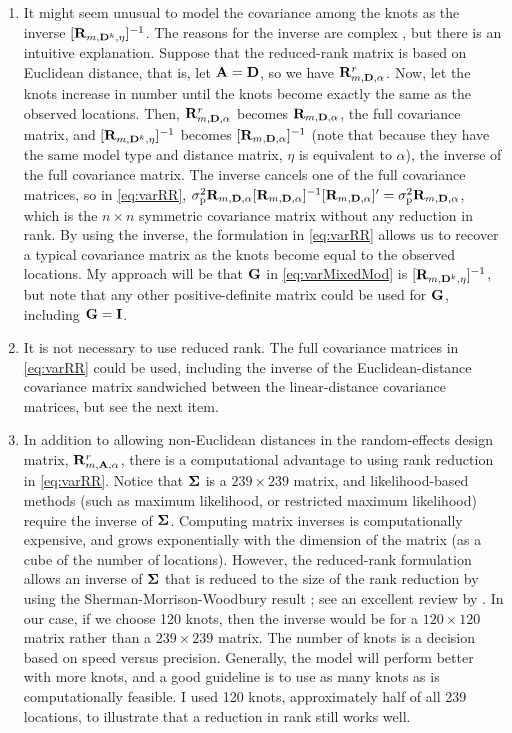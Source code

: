 \documentclass[11pt, titlepage]{article}\usepackage[]{graphicx}\usepackage[]{color}
\begin{document}
\begin{spacing}{1.9}
\begin{flushleft}
\begin{enumerate}
		\item It might seem unusual to model the covariance among the knots as the inverse $[\mathbf{R}_{m,\mathbf{D}^k,\eta}]^{-1}$. The reasons for the inverse are complex \citep{Bane:Gelf:Finl:Sang:gaus:2008},  but there is an intuitive explanation.  Suppose that the reduced-rank matrix is based on Euclidean distance, that is, let $\mathbf{A} = \mathbf{D}$, so we have $\mathbf{R}^r_{m,\mathbf{D},\alpha}$. Now, let the knots increase in number until the knots become exactly the same as the observed locations. Then, $\mathbf{R}^r_{m,\mathbf{D},\alpha}$ becomes $\mathbf{R}_{m,\mathbf{D},\alpha}$, the full covariance matrix, and $[\mathbf{R}_{m,\mathbf{D}^k,\eta}]^{-1}$ becomes $[\mathbf{R}_{m,\mathbf{D},\alpha}]^{-1}$ (note that because they have the same model type and distance matrix, $\eta$ is equivalent to $\alpha$), the inverse of the full covariance matrix. The inverse cancels one of the full covariance matrices, so in \ref{eq:varRR}, $\sigma^2_\textrm{p}\mathbf{R}_{m,\mathbf{D},\alpha}[\mathbf{R}_{m,\mathbf{D},\alpha}]^{-1}[\mathbf{R}_{m,\mathbf{D},\alpha}]^{\prime} = \sigma^2_\textrm{p}\mathbf{R}_{m,\mathbf{D},\alpha}$, which is the $n \times n$ symmetric covariance matrix without any reduction in rank.  By using the inverse, the formulation in \ref{eq:varRR} allows us to recover a typical covariance matrix as the knots become equal to the observed locations.  My approach will be that $\mathbf{G}$ in \ref{eq:varMixedMod} is $[\mathbf{R}_{m,\mathbf{D}^k,\eta}]^{-1}$, but note that any other positive-definite matrix could be used for $\mathbf{G}$, including $\mathbf{G} = \mathbf{I}$.
		\item It is not necessary to use reduced rank.  The full covariance matrices in \ref{eq:varRR} could be used, including the inverse of the Euclidean-distance covariance matrix sandwiched between the linear-distance covariance matrices, but see the next item.
		\item In addition to allowing non-Euclidean distances in the random-effects design matrix, $\mathbf{R}^r_{m,\mathbf{A},\alpha}$, there is a computational advantage to using rank reduction in \ref{eq:varRR}.  Notice that $\mbox{\boldmath $\Sigma$}$ is a $239 \times 239$ matrix, and likelihood-based methods (such as maximum likelihood, or restricted maximum likelihood) require the inverse of $\mbox{\boldmath $\Sigma$}$.  Computing matrix inverses is computationally expensive, and grows exponentially with the dimension of the matrix (as a cube of the number of locations).  However, the reduced-rank formulation allows an inverse of $\mbox{\boldmath $\Sigma$}$ that is reduced to the size of the rank reduction by using the Sherman-Morrison-Woodbury result \citep{Sher:Morr:adju:1949,Wood:inve:1950}; see an excellent review by \citet{Hend:Sear:on:1981}. In our case, if we choose 120 knots, then the inverse would be for a $120 \times 120$ matrix rather than a $239 \times 239$ matrix.  The number of knots is a decision based on speed versus precision.  Generally, the model will perform better with more knots, and a good guideline is to use as many knots as is computationally feasible. I used 120 knots, approximately half of all 239 locations, to illustrate that a reduction in rank still works well.
		

\end{enumerate}
\end{flushleft}
\end{spacing}
\end{document}
